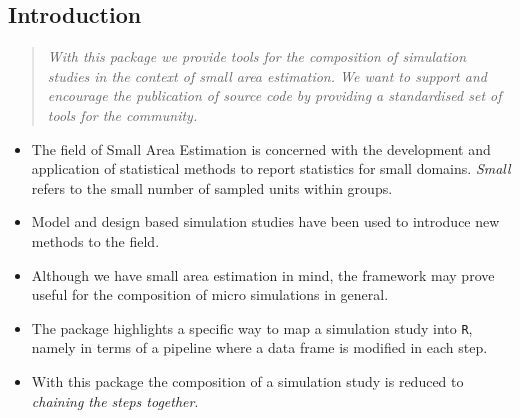 \documentclass[a0,portrait]{a0poster}\usepackage[]{graphicx}\usepackage[]{color}
\newcommand{\mysec}[1]{\color{Black}\section*{#1}\color{DarkSlateGray}}
\newcommand{\code}[1]{\texttt{#1}}
\begin{document}
\begin{multicols}{2} %


\mysec{Introduction}

\begin{verse}
\textit{With this package we provide tools for the composition of simulation studies in the context of small area estimation. We want to support and encourage the publication of source code by providing a standardised set of tools for the community.}
\end{verse}

\begin{multicols}{2}[\setlength{\columnseprule}{0pt}]

\begin{itemize}
  \item The field of Small Area Estimation is concerned with the development and application of statistical methods to report statistics for small domains. \textit{Small} refers to the small number of sampled units within groups.
  \item Model and design based simulation studies have been used to introduce new methods to the field.
  \item Although we have small area estimation in mind, the framework may prove useful for the composition of micro simulations in general.
  \item The package highlights a specific way to map a simulation study into \code{R}, namely in terms of a pipeline where a data frame is modified in each step. 
  \item With this package the composition of a simulation study is reduced to \textit{chaining the steps together}.
\end{itemize}

\columnbreak


\end{multicols}
\end{multicols}
\end{document}
